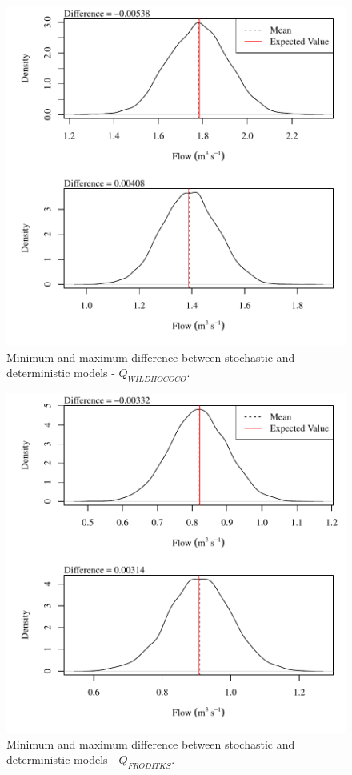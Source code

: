\begin{center}
\begin{figure}[htbp]
	\includegraphics[width=6in]{"Figures/Results_DSR/V min-max diff qWIL"}
	\caption{Minimum and maximum difference between stochastic and deterministic models - $Q_{WILDHOCOCO}$.}
\end{figure}
\end{center}
\newpage

\begin{center}
\begin{figure}[htbp]
	\includegraphics[width=6in]{"Figures/Results_DSR/V min-max diff qFRO"}
	\caption{Minimum and maximum difference between stochastic and deterministic models - $Q_{FRODITKS}$.}
\end{figure}
\end{center}
\newpage

